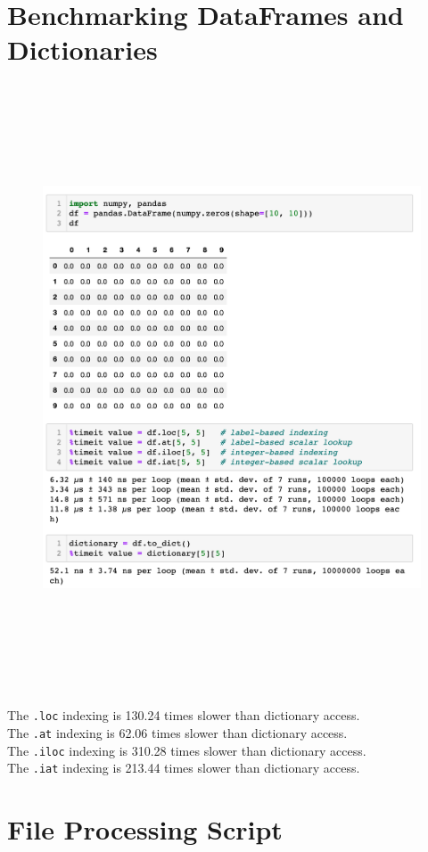 \section{Benchmarking DataFrames and Dictionaries}
\label{benchmarkDF}
		 \begin{figure}[h!]
	\centering
	\includegraphics[height=18cm]{Bilder/appendix/dfvsdict.png}
	\label{fig:dbscan-plot}
\end{figure}
The \lstinline|.loc| indexing is  130.24 times slower than dictionary access.\\
The \lstinline|.at|  indexing is  62.06 times slower than dictionary access.\\
The \lstinline|.iloc|  indexing is  310.28 times slower than dictionary access.\\
The \lstinline|.iat|  indexing is  213.44 times slower than dictionary access.

\section{File Processing Script}





